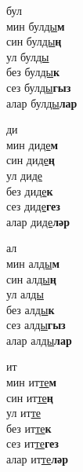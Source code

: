 \begin{multicols}{4}
\begin{enumerate}
\begin{minipage}{\linewidth}
    \item
    бул\\
    мин бул\underline{ды}\textbf{м}\\
    син бул\underline{ды}\textbf{ң}\\
    ул бул\underline{ды}\\
    без бул\underline{ды}\textbf{к}\\
    сез бул\underline{ды}\textbf{гыз}\\
    алар бул\underline{ды}\textbf{лар}\\
\end{minipage}

\begin{minipage}{\linewidth}
    \item
    ди\\
    мин ди\underline{де}\textbf{м}\\
    син ди\underline{де}\textbf{ң}\\
    ул ди\underline{де}\\
    без ди\underline{де}\textbf{к}\\
    сез ди\underline{де}\textbf{гез}\\
    алар ди\underline{де}\textbf{ләр}\\
\end{minipage}

\begin{minipage}{\linewidth}
    \item
    ал\\
    мин ал\underline{ды}\textbf{м}\\
    син ал\underline{ды}\textbf{ң}\\
    ул ал\underline{ды}\\
    без ал\underline{ды}\textbf{к}\\
    сез ал\underline{ды}\textbf{гыз}\\
    алар ал\underline{ды}\textbf{лар}\\
\end{minipage}

\begin{minipage}{\linewidth}
    \item
    ит\\
    мин ит\underline{те}\textbf{м}\\
    син ит\underline{те}\textbf{ң}\\
    ул ит\underline{те}\\
    без ит\underline{те}\textbf{к}\\
    сез ит\underline{те}\textbf{гез}\\
    алар ит\underline{те}\textbf{ләр}\\
\end{minipage}


\end{enumerate}
\end{multicols}
